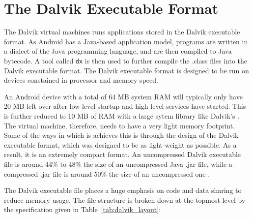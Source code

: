 \section{The Dalvik Executable Format}
\label{sec:dex}

The Dalvik virtual machines runs applications stored in the Dalvik executable format. As Android has a Java-based application model, programs are written in a dialect of the Java programming language, and are then compiled to Java bytecode. A tool called \verb|dx| is then used to further compile the .class files into the Dalvik executable format. The Dalvik executable format is designed to be run on devices constained in processor and memory speed.

An Android device with a total of 64 MB system RAM will typically only have 20 MB left over after low-level startup and high-level services have started. This is further reduced to 10 MB of RAM with a large sytem library like Dalvik's \cite{dalvik_int}. The virtual machine, therefore, needs to have a very light memory footprint. Some of the ways in which is achieves this is through the design of the Dalvik executable format, which was designed to be as light-weight as possible. As a result, it is an extremely compact format. An uncompressed Dalvik executable file is around 44\% to 48\% the size of an uncompressed Java .jar file, while a compressed .jar file is around 50\% the size of an uncompressed one \cite{dalvik_int}.

The Dalvik executable file places a huge emphasis on code and data sharing to reduce memory usage. The file structure is broken down at the topmost level by the specification given in Table~\ref{tab:dalvik_layout}:

